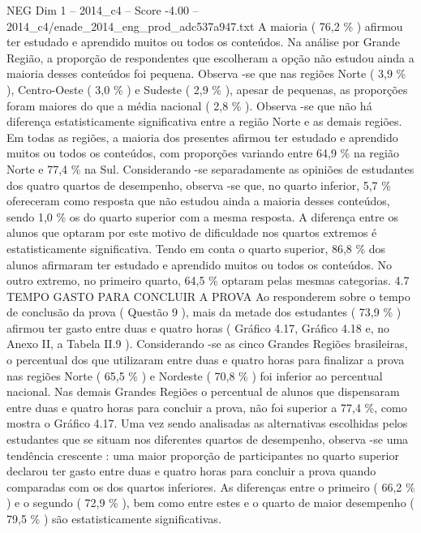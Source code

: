 \begin{textsample}{NEG Dim 1 – 2014\_c4 – Score -4.00 – 2014\_c4/enade\_2014\_eng\_prod\_adc537a947.txt}
A maioria ( 76,2 \% ) afirmou ter estudado e aprendido muitos ou todos os conteúdos.
Na análise por Grande Região, a proporção de respondentes que escolheram a opção não estudou ainda a maioria desses conteúdos foi pequena.
Observa -se que nas regiões Norte ( 3,9 \% ), Centro-Oeste ( 3,0 \% ) e Sudeste ( 2,9 \% ), apesar de pequenas, as proporções foram maiores do que a média nacional ( 2,8 \% ).
Observa -se que não há diferença estatisticamente significativa entre a região Norte e as demais regiões.
Em todas as regiões, a maioria dos presentes afirmou ter estudado e aprendido muitos ou todos os conteúdos, com proporções variando entre 64,9 \% na região Norte e 77,4 \% na Sul.
Considerando -se separadamente as opiniões de estudantes dos quatro quartos de desempenho, observa -se que, no quarto inferior, 5,7 \% ofereceram como resposta que não estudou ainda a maioria desses conteúdos, sendo 1,0 \% os do quarto superior com a mesma resposta.
A diferença entre os alunos que optaram por este motivo de dificuldade nos quartos extremos é estatisticamente significativa.
Tendo em conta o quarto superior, 86,8 \% dos alunos afirmaram ter estudado e aprendido muitos ou todos os conteúdos.
No outro extremo, no primeiro quarto, 64,5 \% optaram pelas mesmas categorias. 4.7 TEMPO GASTO PARA CONCLUIR A PROVA Ao responderem sobre o tempo de conclusão da prova ( Questão 9 ), mais da metade dos estudantes ( 73,9 \% ) afirmou ter gasto entre duas e quatro horas ( Gráfico 4.17, Gráfico 4.18 e, no Anexo II, a Tabela II.9 ).
Considerando -se as cinco Grandes Regiões brasileiras, o percentual dos que utilizaram entre duas e quatro horas para finalizar a prova nas regiões Norte ( 65,5 \% ) e Nordeste ( 70,8 \% ) foi inferior ao percentual nacional.
Nas demais Grandes Regiões o percentual de alunos que dispensaram entre duas e quatro horas para concluir a prova, não foi superior a 77,4 \%, como mostra o Gráfico 4.17.
Uma vez sendo analisadas as alternativas escolhidas pelos estudantes que se situam nos diferentes quartos de desempenho, observa -se uma tendência crescente : uma maior proporção de participantes no quarto superior declarou ter gasto entre duas e quatro horas para concluir a prova quando comparadas com os dos quartos inferiores.
As diferenças entre o primeiro ( 66,2 \% ) e o segundo ( 72,9 \% ), bem como entre estes e o quarto de maior desempenho ( 79,5 \% ) são estatisticamente significativas.

\end{textsample}
